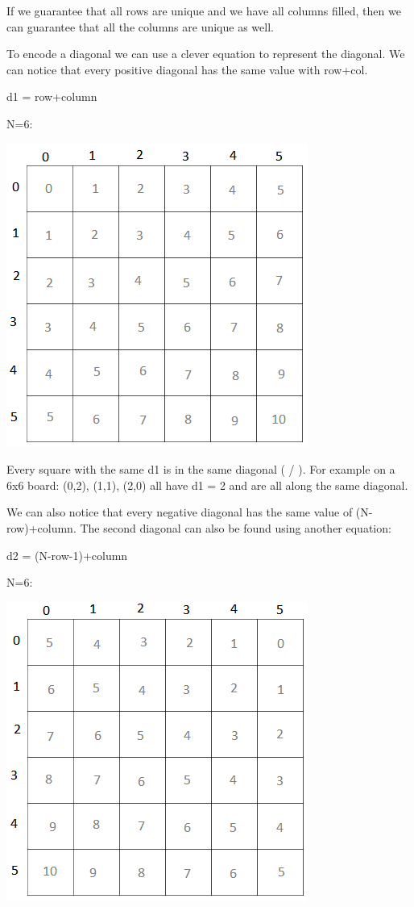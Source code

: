 \documentclass[11pt,oneside]{book}
\makeatletter
\def\maxwidth#1{\ifdim\Gin@nat@width>#1 #1\else\Gin@nat@width\fi}
\makeatother
\begin{document}
If we guarantee that all rows are unique and we have all columns filled, then we can guarantee that all the columns are unique as well.

To encode a diagonal we can use a clever equation to represent the diagonal. We can notice that every positive diagonal has the same value with row+col.

d1 = row+column

N=6:

\vspace{5px}\includegraphics[width=\maxwidth{\textwidth}]{nqueen1.png}

Every square with the same d1 is in the same diagonal ( / ). For example on a 6x6 board: (0,2), (1,1), (2,0) all have d1 = 2 and are all along the same diagonal.

We can also notice that every negative diagonal has the same value of (N-row)+column. The second diagonal can also be found using another equation:

d2 = (N-row-1)+column

N=6:

\vspace{5px}\includegraphics[width=\maxwidth{\textwidth}]{nqueen2.png}
\end{document}
